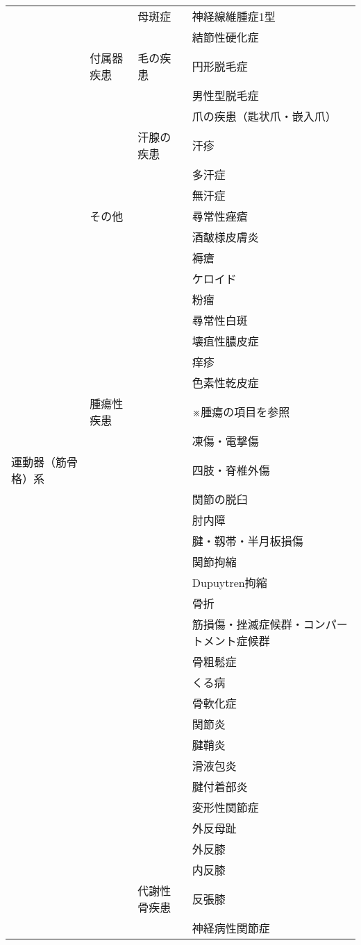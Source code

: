 \begin{xltabular}{\linewidth}{XXXX}
 &  & 母斑症 & 神経線維腫症1型 \\
 &  &  & 結節性硬化症 \\
 & 付属器疾患 & 毛の疾患 & 円形脱毛症 \\
 &  &  & 男性型脱毛症 \\
 &  &  & 爪の疾患（匙状爪・嵌入爪） \\
 &  & 汗腺の疾患 & 汗疹 \\
 &  &  & 多汗症 \\
 &  &  & 無汗症 \\
 & その他 &  & 尋常性痤瘡 \\
 &  &  & 酒皶様皮膚炎 \\
 &  &  & 褥瘡 \\
 &  &  & ケロイド \\
 &  &  & 粉瘤 \\
 &  &  & 尋常性白斑 \\
 &  &  & 壊疽性膿皮症 \\
 &  &  & 痒疹 \\
 &  &  & 色素性乾皮症 \\
 & 腫瘍性疾患 &  & ※腫瘍の項目を参照 \\
 &  &  & 凍傷・電撃傷 \\
運動器（筋骨格）系 &  &  & 四肢・脊椎外傷 \\
 &  &  & 関節の脱臼 \\
 &  &  & 肘内障 \\
 &  &  & 腱・靱帯・半月板損傷 \\
 &  &  & 関節拘縮 \\
 &  &  & Dupuytren拘縮 \\
 &  &  & 骨折 \\
 &  &  & 筋損傷・挫滅症候群・コンパートメント症候群 \\
 &  &  & 骨粗鬆症 \\
 &  &  & くる病 \\
 &  &  & 骨軟化症 \\
 &  &  & 関節炎 \\
 &  &  & 腱鞘炎 \\
 &  &  & 滑液包炎 \\
 &  &  & 腱付着部炎 \\
 &  &  & 変形性関節症 \\
 &  &  & 外反母趾 \\
 &  &  & 外反膝 \\
 &  &  & 内反膝 \\
 &  & 代謝性骨疾患 & 反張膝 \\
 &  &  & 神経病性関節症 \\

\end{xltabular}
